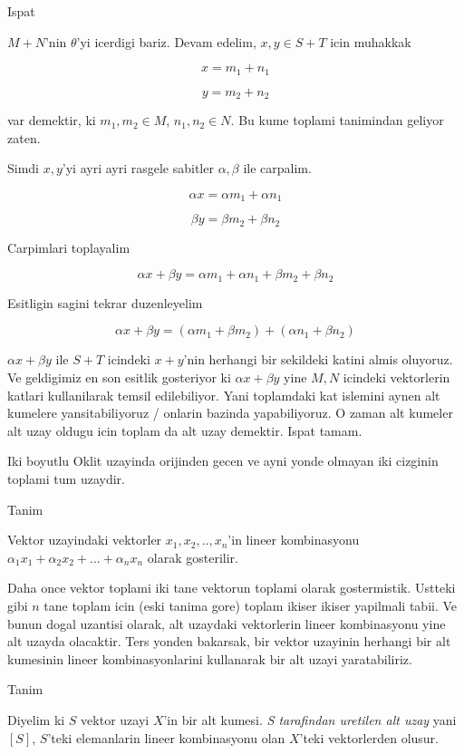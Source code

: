 \documentclass[12pt,fleqn]{article}
\begin{document}
Ispat 

$M+N$'nin $\theta$'yi icerdigi bariz. Devam edelim, $x,y \in S+T$ icin
muhakkak 

\[ x = m_1 + n_1 \]

\[ y = m_2 + n_2 \]

var demektir, ki $m_1,m_2 \in M$, $n_1,n_2 \in N$. Bu kume toplami
tanimindan geliyor zaten. 

Simdi $x,y$'yi ayri ayri rasgele sabitler $\alpha,\beta$ ile carpalim. 

\[ \alpha x = \alpha m_1 + \alpha n_1 \]

\[ \beta y = \beta m_2 + \beta n_2 \]

Carpimlari toplayalim

\[ \alpha x + \beta y  = \alpha m_1 + \alpha n_1 + \beta m_2 + \beta n_2 \]

Esitligin sagini tekrar duzenleyelim

\[ \alpha x + \beta y  = (\alpha m_1 + \beta m_2) + (\alpha n_1  + \beta n_2 )\]

$\alpha x + \beta y $ ile $S+T$ icindeki $x+y$'nin herhangi bir sekildeki
katini almis oluyoruz. Ve geldigimiz en son esitlik gosteriyor 
ki $\alpha x
+ \beta y$ yine $M,N$ icindeki vektorlerin katlari kullanilarak 
temsil edilebiliyor. Yani toplamdaki kat islemini aynen alt kumelere
yansitabiliyoruz / onlarin bazinda yapabiliyoruz. O zaman alt kumeler alt
uzay oldugu icin toplam da alt uzay demektir. Ispat tamam.

Iki boyutlu Oklit uzayinda orijinden gecen ve ayni yonde olmayan iki cizginin
toplami tum uzaydir. 

Tanim

Vektor uzayindaki vektorler $x_1,x_2,..,x_n$'in lineer kombinasyonu
$\alpha_1 x_1 + \alpha_2 x_2 + ... + \alpha_n x_n$ olarak gosterilir. 

Daha once vektor toplami iki tane vektorun toplami olarak
gostermistik. Ustteki gibi $n$ tane toplam icin (eski tanima gore) toplam
ikiser ikiser yapilmali tabii. Ve bunun dogal uzantisi olarak, alt
uzaydaki vektorlerin lineer kombinasyonu yine alt uzayda olacaktir. Ters
yonden bakarsak, bir vektor uzayinin herhangi bir alt kumesinin lineer
kombinasyonlarini kullanarak bir alt uzayi yaratabiliriz. 

Tanim

Diyelim ki $S$ vektor uzayi $X$'in bir alt kumesi. {\em S tarafindan
  uretilen alt uzay} yani $[S]$, $S$'teki elemanlarin lineer
kombinasyonu olan $X$'teki vektorlerden olusur. 
\end{document}
